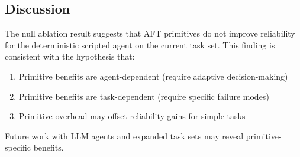\subsection{Discussion}

The null ablation result suggests that AFT primitives do not improve reliability for the deterministic scripted agent on the current task set. This finding is consistent with the hypothesis that:

\begin{enumerate}
    \item Primitive benefits are agent-dependent (require adaptive decision-making)
    \item Primitive benefits are task-dependent (require specific failure modes)
    \item Primitive overhead may offset reliability gains for simple tasks
\end{enumerate}

Future work with LLM agents and expanded task sets may reveal primitive-specific benefits.

